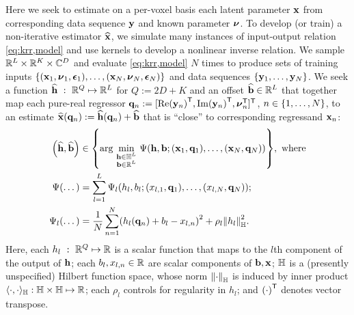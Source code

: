 Here we seek to estimate 
on a per-voxel basis
each latent parameter $\mathbf{x}$
from corresponding data sequence $\mathbf{y}$ 
and known parameter $\boldsymbol{\nu}$.
To develop (or train) a non-iterative estimator $\widehat{\mathbf{x}}$,
we simulate many instances 
of input-output relation \eqref{eq:krr,model}
and use kernels
to develop a nonlinear inverse relation.
We sample $\mathbb{R}^{L} \times \mathbb{R}^{K} \times \mathbb{C}^{D}$
and evaluate \eqref{eq:krr,model} $N$ times
to produce sets of training inputs
$\set{\paren{\bmx_1,\bmnu_1,\bmeps_1},\dots,\paren{\bmx_N,\bmnu_N,\bmeps_N}}$
and data sequences
$\set{\bmy_1,\dots,\bmy_N}$. 
We seek a function
$\widehat{\mathbf{h}}~:~\mathbb{R}^{Q} \mapsto \mathbb{R}^{L}$
for $Q := 2D+K$
and an offset $\widehat{\mathbf{b}} \in \mathbb{R}^{L}$
that together map each pure-real regressor
$\bmq_n := [\re{\bmy_n}\tpose, \im{\bmy_n}\tpose, \bmnu_n\tpose]\tpose$,
$n \in \set{1,\dots,N}$, 
to an estimate 
$\bmxha{\bmq_n} := \bmhha{\bmq_n}+\est{\bmb}$ 
that is ``close'' to corresponding regressand $\mathbf{x}_n$:
\begin{align}
	\paren{\est{\bmh},\est{\bmb}} &\in 
		\set{\argmin{\substack{\bmh \in \hilb^L \\ \bmb \in \reals{L}}}
		\costa{\bmh, \bmb; \paren{\bmx_1,\bmq_1},\dots,\paren{\bmx_N,\bmq_N}}}, 
		\where \label{eq:krr,prob} \\
	\costa{\dots} &= 
		\sum_{l=1}^L \cost_l\paren{h_l,b_l; 
		\paren{x_{l,1},\bmq_1},\dots,\paren{x_{l,N},\bmq_N}}; 
		\label{eq:krr,cost} \\
	\Psi_l(\dots) &= 
		\frac{1}{N} \sum_{n=1}^N \paren{h_l(\bmq_n) + 
		b_l - x_{l,n}}^2 + \rho_l \norm{h_l}_\hilb^2.
	\label{eq:krr,cost-l}
\end{align}
Here, each $h_l~:~\mathbb{R}^{Q} \mapsto \mathbb{R}$ is a scalar function
that maps to the $l$th component of the output of $\mathbf{h}$; 
each $b_l,x_{l,n} \in \mathbb{R}$ are scalar components of $\mathbf{b},\mathbf{x}$;
$\mathbb{H}$ is a (presently unspecified) Hilbert function space,
whose norm $\norm{\cdot}_\hilb$ is
induced by inner product 
$\langle \cdot,\cdot \rangle_{\mathbb{H}} : \mathbb{H} \times \mathbb{H} \mapsto \mathbb{R}$; 
each $\rho_l$ controls for regularity in $h_l$;
and $\paren{\cdot}\tpose$ denotes vector transpose.

